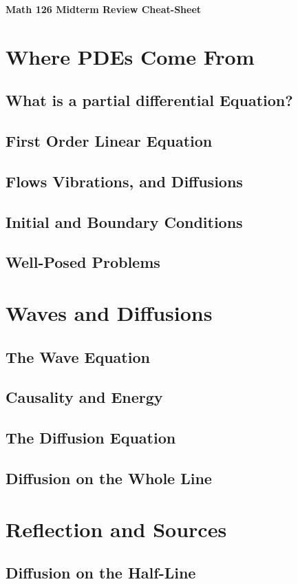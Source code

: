 \documentclass[11pt,letterpaper]{article}
\begin{document}
\begin{center}
    {\Large \textbf{Math 126 Midterm Review Cheat-Sheet}}
\end{center}
\section{Where PDEs Come From}
\subsection{What is a partial differential Equation?}
\subsection{First Order Linear Equation}
\subsection{Flows Vibrations, and Diffusions}
\subsection{Initial and Boundary Conditions}
\subsection{Well-Posed Problems}
\section{Waves and Diffusions}
\subsection{The Wave Equation}
\subsection{Causality and Energy}
\subsection{The Diffusion Equation}
\subsection{Diffusion on the Whole Line}
\section{Reflection and Sources}
\subsection{Diffusion on the Half-Line}
\end{document}
